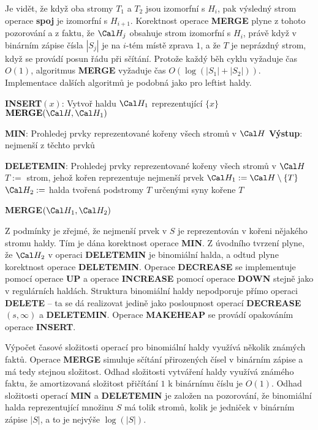 \documentclass[a4paper,12pt]{article}
\begin{document}
Je vidět, že když oba stromy $T_1$ a $T_2$ jsou izomorfní 
s $H_i$, pak výsledný strom operace {\bf spoj} je izomorfní 
s $H_{i+1}$. Korektnost ope\-race {\bf MERGE} plyne z tohoto 
pozorování a z faktu, že $\Cal H_j$ obsahuje strom izomorfní s 
$H_i$, právě když v binárním zápise čísla $
|S_j|$ je na $i$-tém 
místě zprava $1$, a že $T$ je neprázdný strom, když se 
provádí posun řádu při sčítání. Protože každý běh 
cyklu vyžaduje čas $O(1)$, algoritmus {\bf MER\-GE} vyžaduje čas 
$O(\log(|S_1|+|S_2|))$. Implementace dalších algoritmů 
je podobná jako pro leftist haldy. 

{\bf INSERT$(x)$}:\newline 
Vytvoř haldu $\Cal H_1$ reprezentující $\{x\}$\newline 
$\bold M\bold E\bold R\bold G\bold E(\Cal H,\Cal H_1)$

{\bf MIN}:\newline 
Prohledej prvky reprezentované kořeny všech stromů 
v $\Cal H$\newline 
{\bf Výstup}: nejmenší z těchto prvků  

{\bf DELETEMIN}:\newline 
Prohledej prvky reprezentované kořeny všech stromů 
v $\Cal H$\newline 
$T:=$ strom, jehož kořen reprezentuje nejmenší prvek\newline 
$\Cal H_1:=\Cal H\setminus \{T\}$\newline 
$\Cal H_2:=$ halda tvořená podstromy $T$ určenými syny kořene $
T$\newline 
{\bf MERGE$(\Cal H_1,\Cal H_2)$

}
Z podmínky  je zřejmé, že 
nejmenší prvek v $S$ je reprezentován v kořeni nějakého  
stromu haldy. Tím je dána korekt\-nost operace {\bf MIN}.
Z úvodního tvrzení plyne, že $\Cal H_2$ v operaci {\bf DELE\-TE\-MIN} je 
binomiální halda, a odtud plyne korekt\-nost ope\-race 
{\bf DE\-LE\-TEMIN}. Operace {\bf DECREASE} se implementuje pomocí 
ope\-race {\bf UP} a ope\-race {\bf INCREASE} pomocí 
operace {\bf DOWN} stejně jako v regulárních haldách. 
Struktura binomiální haldy nepodporuje přímo operaci 
{\bf DELETE} -- ta se dá realizovat jedině jako posloupnost 
operací {\bf DECREASE$(s,\infty )$} a {\bf DELETEMIN}.  
Operace {\bf MAKEHEAP} se provádí opakováním operace {\bf INSERT}.

Výpočet časové složitosti operací pro binomiální haldy 
využívá několik známých faktů.  Ope\-race {\bf MERGE }
simuluje sčítání přirozených čísel v binárním zápise a má 
tedy stejnou složitost.  Odhad složitosti vytváření haldy využívá 
známého faktu, že amortizovaná složitost přičítání $
1$  
k binárnímu číslu je $O(1)$.  
Odhad složitosti operací {\bf MIN} a {\bf DELETEMIN} je založen na 
pozorování, že binomiální halda reprezentující množinu $
S$ má 
tolik stromů, kolik je jedniček v binárním zápise $
|S|$, a 
to je nejvýše $\log(|S|)$.  
\end{document}
